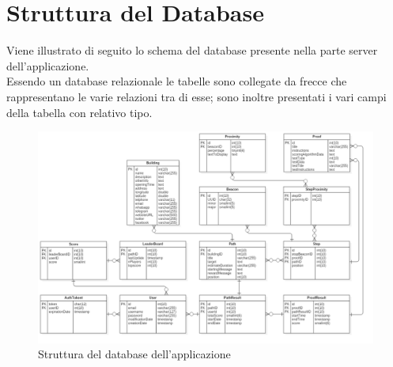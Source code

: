 \section{Struttura del Database}
\label{strutturaDelDatabase}
Viene illustrato di seguito lo schema del database  presente nella parte server dell'applicazione.\\
Essendo un database relazionale le tabelle sono collegate da frecce che rappresentano le varie relazioni tra di esse; sono inoltre presentati i vari campi della tabella con relativo tipo.

\begin{figure}[!h]
	\centering
	\includegraphics[scale=0.33]{img/Database_Schema}  
	\caption{Struttura del database dell'applicazione}
\end{figure}